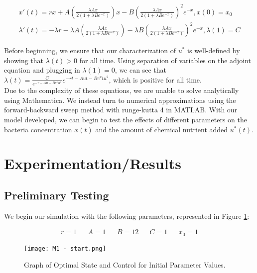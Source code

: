 \documentclass[10pt]{article}
\theoremstyle{exmp}
\begin{document}
\begin{align}
    x'(t) = rx + A(\frac{\lambda Ax}{2(1+\lambda Be^{-x})})x - B(\frac{\lambda Ax}{2(1+\lambda Be^{-x})})^2e^{-x}, x(0) = x_0 \\
    \lambda'(t) = -\lambda r - \lambda A(\frac{\lambda Ax}{2(1+\lambda Be^{-x})}) - \lambda B(\frac{\lambda Ax}{2(1+\lambda Be^{-x})})^2e^{-x}, \lambda(1) = C
\end{align}

\noindent Before beginning, we ensure that our characterization of $u^*$ is well-defined by showing that $\lambda(t) > 0$ for all time. Using separation of variables on the adjoint equation and plugging in $\lambda(1) = 0$, we can see that $\lambda(t) = \frac{C}{e^{-r-Au-Be^{x}u^2}}e^{-rt-Aut-Be^{x}tu^2}$, which is positive for all time. \\

\noindent Due to the complexity of these equations, we are unable to solve analytically using Mathematica. We instead turn to numerical approximations using the forward-backward sweep method with runge-kutta 4 in MATLAB. With our model developed, we can begin to test the effects of different parameters on the bacteria concentration $x(t)$ and the amount of chemical nutrient added $u^*(t)$.



\newpage \section{Experimentation/Results}
\label{sec:results} 	

\subsection{Preliminary Testing}

We begin our simulation with the following parameters, represented in Figure \ref{fig:start}:

\begin{align*}
    r = 1 && A = 1 && B = 12 && C = 1 && x_0 = 1
\end{align*}

\begin{figure}
\centering
\texttt{[image: M1 - start.png]}
\caption{Graph of Optimal State and Control for Initial Parameter Values.}
\label{fig:start}
\end{figure}
\end{document}

